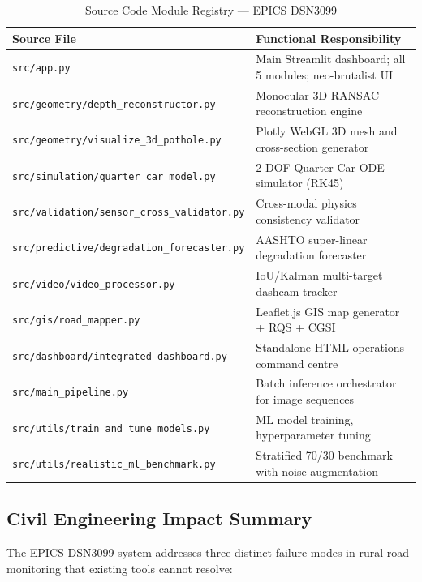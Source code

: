 \begin{table}[htbp]
\centering
\small
\caption{Source Code Module Registry --- EPICS DSN3099}
\label{tab:module_registry}
\begin{tabularx}{\textwidth}{p{5.4cm}X}
\toprule
\textbf{Source File} & \textbf{Functional Responsibility} \\
\midrule
\texttt{src/app.py} & Main Streamlit dashboard; all 5 modules; neo-brutalist UI \\
\texttt{src/geometry/depth\_reconstructor.py} & Monocular 3D RANSAC reconstruction engine \\
\texttt{src/geometry/visualize\_3d\_pothole.py} & Plotly WebGL 3D mesh and cross-section generator \\
\texttt{src/simulation/quarter\_car\_model.py} & 2-DOF Quarter-Car ODE simulator (RK45) \\
\texttt{src/validation/sensor\_cross\_validator.py} & Cross-modal physics consistency validator \\
\texttt{src/predictive/degradation\_forecaster.py} & AASHTO super-linear degradation forecaster \\
\texttt{src/video/video\_processor.py} & IoU/Kalman multi-target dashcam tracker \\
\texttt{src/gis/road\_mapper.py} & Leaflet.js GIS map generator + RQS + CGSI \\
\texttt{src/dashboard/integrated\_dashboard.py} & Standalone HTML operations command centre \\
\texttt{src/main\_pipeline.py} & Batch inference orchestrator for image sequences \\
\texttt{src/utils/train\_and\_tune\_models.py} & ML model training, hyperparameter tuning \\
\texttt{src/utils/realistic\_ml\_benchmark.py} & Stratified 70/30 benchmark with noise augmentation \\
\bottomrule
\end{tabularx}
\end{table}

\subsection{Civil Engineering Impact Summary}
The EPICS DSN3099 system addresses three distinct failure modes in rural road monitoring that existing tools cannot resolve:

